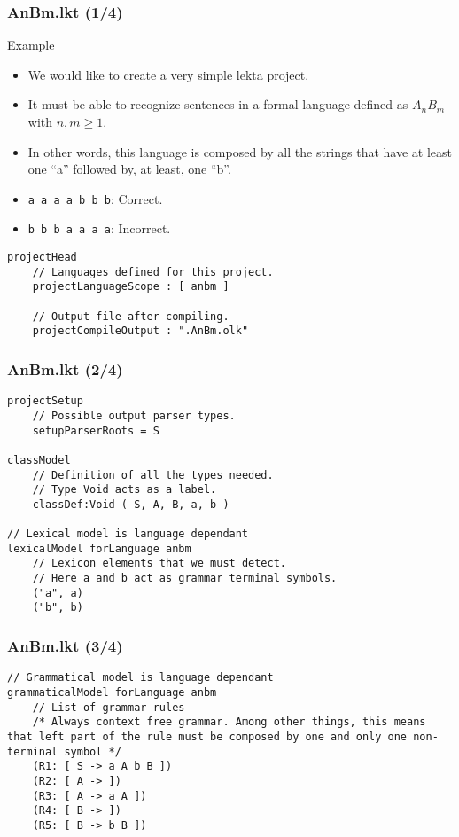 \documentclass[11pt]{beamer}
\begin{document}
\begin{frame}[fragile]
\frametitle{AnBm.lkt (1/4)}
	\begin{block}{Example}
			\begin{itemize}
				\item We would like to create a very simple lekta project.
				\pause
				\item It must be able to recognize sentences in a formal language defined as $A_nB_m$ with $n,m \geq 1$. 
				\pause
				\item In other words, this language is composed by all the strings that have at least one ``a'' followed by, at least, one ``b''.
				\pause
				\item \texttt{a a a a b b b}: {\color{green}Correct}.
				\pause
				\item \texttt{b b b a a a a}: {\color{red}Incorrect}.
			\end{itemize}
	\end{block}
\pause
\scriptsize
\begin{lstlisting}[language=lekta]
projectHead
	// Languages defined for this project.
	projectLanguageScope : [ anbm ]
	
	// Output file after compiling.
	projectCompileOutput : ".AnBm.olk"
\end{lstlisting}
\end{frame}

\begin{frame}[fragile]
\frametitle{AnBm.lkt (2/4)}
\small
\begin{lstlisting}[language=lekta]
projectSetup
	// Possible output parser types.
	setupParserRoots = S

classModel
	// Definition of all the types needed.
	// Type Void acts as a label.
	classDef:Void ( S, A, B, a, b )

// Lexical model is language dependant
lexicalModel forLanguage anbm
	// Lexicon elements that we must detect.
	// Here a and b act as grammar terminal symbols.
	("a", a)
	("b", b)
\end{lstlisting}
\end{frame}

\begin{frame}[fragile]
\frametitle{AnBm.lkt (3/4)}
\begin{lstlisting}[language=lekta]
// Grammatical model is language dependant
grammaticalModel forLanguage anbm
	// List of grammar rules 
	/* Always context free grammar. Among other things, this means that left part of the rule must be composed by one and only one non-terminal symbol */
	(R1: [ S -> a A b B ])
	(R2: [ A -> ])
	(R3: [ A -> a A ])
	(R4: [ B -> ])
	(R5: [ B -> b B ])
\end{lstlisting}
\end{frame}
\end{document}
